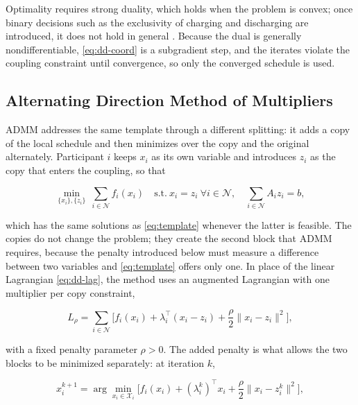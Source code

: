 \documentclass[conference]{IEEEtran}
\begin{document}
Optimality requires strong duality, which holds when the problem is convex; once binary decisions such as the exclusivity of charging and discharging are introduced, it does not hold in general \cite{Diekerhof2018}. Because the dual is generally nondifferentiable, \eqref{eq:dd-coord} is a subgradient step, and the iterates violate the coupling constraint until convergence, so only the converged schedule is used.

\subsection{Alternating Direction Method of Multipliers}

ADMM addresses the same template through a different splitting: it adds a copy of the local schedule and then minimizes over the copy and the original alternately. Participant $i$ keeps $x_i$ as its own variable and introduces $z_i$ as the copy that enters the coupling, so that

\begin{equation}
\min_{\{x_i\},\{z_i\}} \ \sum_{i\in\mathcal{N}} f_i(x_i) \quad \text{s.t.} \ x_i = z_i \ \forall i\in\mathcal{N}, \quad \sum_{i\in\mathcal{N}} A_i z_i = b ,
\label{eq:admm-form}
\end{equation}

which has the same solutions as \eqref{eq:template} whenever the latter is feasible. The copies do not change the problem; they create the second block that ADMM requires, because the penalty introduced below must measure a difference between two variables and \eqref{eq:template} offers only one. In place of the linear Lagrangian \eqref{eq:dd-lag}, the method uses an augmented Lagrangian \cite{Boyd2011} with one multiplier per copy constraint,

\begin{equation}
L_\rho = \sum_{i\in\mathcal{N}} \Big[ f_i(x_i) + \lambda_i^{\top}(x_i - z_i) + \frac{\rho}{2}\big\lVert x_i - z_i \big\rVert^{2} \Big],
\label{eq:admm-auglag}
\end{equation}

with a fixed penalty parameter $\rho>0$. The added penalty is what allows the two blocks to be minimized separately: at iteration $k$,

\begin{equation}
x_i^{k+1} = \arg\min_{x_i\in\mathcal{X}_i} \Big[ f_i(x_i) + (\lambda_i^{k})^{\top} x_i + \frac{\rho}{2}\big\lVert x_i - z_i^{k} \big\rVert^{2} \Big],
\label{eq:admm-x}
\end{equation}
\end{document}
